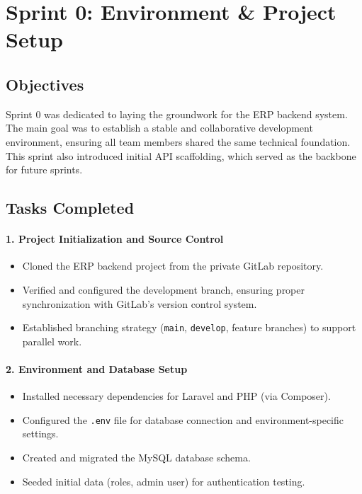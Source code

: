 \section{Sprint 0: Environment \& Project Setup}

\subsection{Objectives}
Sprint 0 was dedicated to laying the groundwork for the ERP backend system. 
The main goal was to establish a stable and collaborative development environment, ensuring all team members shared the same technical foundation. 
This sprint also introduced initial API scaffolding, which served as the backbone for future sprints.

\subsection{Tasks Completed}

\paragraph{1. Project Initialization and Source Control}
\begin{itemize}
    \item Cloned the ERP backend project from the private GitLab repository.
    \item Verified and configured the development branch, ensuring proper synchronization with GitLab’s version control system.
    \item Established branching strategy (\texttt{main}, \texttt{develop}, feature branches) to support parallel work.
\end{itemize}

\paragraph{2. Environment and Database Setup}
\begin{itemize}
    \item Installed necessary dependencies for Laravel and PHP (via Composer).
    \item Configured the \texttt{.env} file for database connection and environment-specific settings.
    \item Created and migrated the MySQL database schema.
    \item Seeded initial data (roles, admin user) for authentication testing.
\end{itemize}

